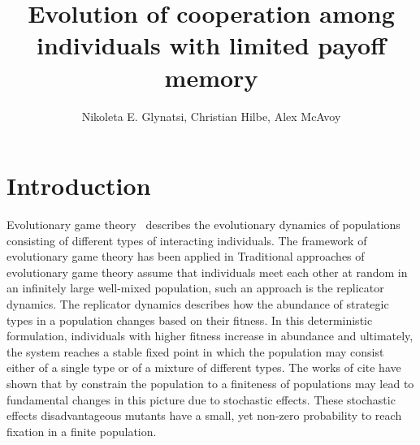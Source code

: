 \documentclass[11pt]{article}
\title{\bf  \sffamily \LARGE Evolution of cooperation among individuals with
limited payoff memory\\}
\date{}
\author{Nikoleta E. Glynatsi, Christian Hilbe, Alex McAvoy}
\theoremstyle{plainCl1}
\theoremstyle{plainCl2}
\begin{document}
\maketitle

\begin{abstract}

\end{abstract}

\section{Introduction}

Evolutionary game theory~\cite{smith1982evolution, hofbauer1998evolutionary,
nowak2004evolutionary, hauert2005game} describes the evolutionary dynamics of
populations consisting of different types of interacting individuals. The
framework of evolutionary game theory has been applied in %
Traditional approaches of evolutionary game theory assume that individuals meet
each other at random in an infinitely large well-mixed population, such an
approach is the replicator dynamics. The replicator dynamics describes how the
abundance of strategic types in a population changes based on their fitness. In
this deterministic formulation, individuals with higher fitness increase in
abundance and ultimately, the system reaches a stable fixed point in which the
population may consist either of a single type or of a mixture of different
types. The works of cite have shown that by constrain the population to a
finiteness of populations may lead to fundamental changes in this picture due to
stochastic effects. These stochastic effects disadvantageous mutants have a
small, yet non-zero probability to reach fixation in a finite population.
\end{document}
